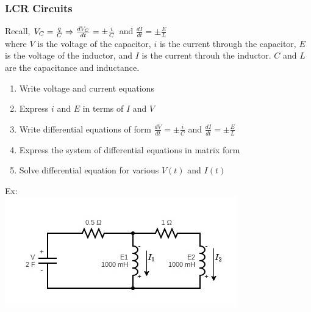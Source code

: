 \documentclass[11pt, fleqn]{article}
\begin{document}
\subsubsection{LCR Circuits}
Recall, $V_C=\frac{q}{C}\Rightarrow\frac{dV_C}{dt}=\pm\frac{i}{C}$ and $\frac{dI}{dt}=\pm\frac{E}{L}$\\
where $V$ is the voltage of the capacitor, $i$ is the current through the capacitor, $E$ is the voltage of the inductor, and $I$ is the current throuh the inductor. $C$ and $L$ are the capacitance and inductance. 
\begin{enumerate}
    \item Write voltage and current equations
    \item Express $i$ and $E$ in terms of $I$ and $V$
    \item Write differential equations of form $\frac{dV}{dt}=\pm\frac{i}{C}$ and $\frac{dI}{dt}=\pm\frac{E}{L}$
    \item Express the system of differential equations in matrix form
    \item Solve differential equation for various $V(t)$ and $I(t)$
\end{enumerate}
Ex:\\
\includegraphics[scale=0.8]{LinearAlgebraPictures/LCRcircuitEx.jpg}
\end{document}
